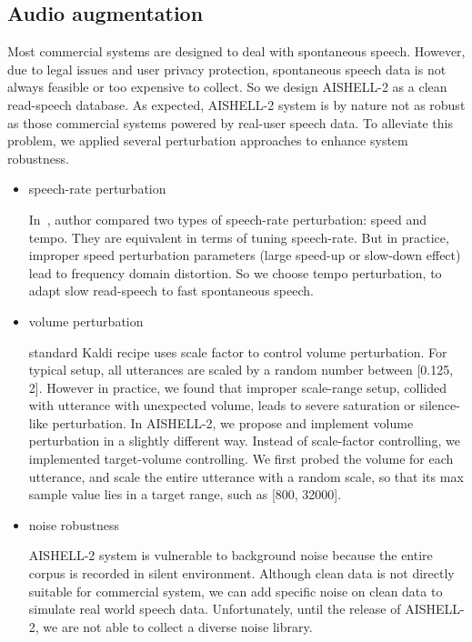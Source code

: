 \documentclass[a4paper]{article}
\begin{document}
\subsection{Audio augmentation}

Most commercial systems are designed to deal with spontaneous speech. However,
due to legal issues and user privacy protection, spontaneous speech data is not
always feasible or too expensive to collect. So we design AISHELL-2 as a clean
read-speech database. As expected, AISHELL-2 system is by nature not as robust
as those commercial systems powered by real-user speech data. To alleviate this
problem, we applied several perturbation approaches to enhance system
robustness.

\begin{itemize}
\item speech-rate perturbation

  In~\cite{tomko}, author compared two types of speech-rate perturbation: speed
  and tempo. They are equivalent in terms of tuning speech-rate. But in
  practice, improper speed perturbation parameters (large speed-up or slow-down
  effect) lead to frequency domain distortion. So we choose tempo perturbation,
  to adapt slow read-speech to fast spontaneous speech.

\item volume perturbation

  standard Kaldi recipe uses scale factor to control volume perturbation. For
  typical setup, all utterances are scaled by a random number between [0.125,
    2]. However in practice, we found that improper scale-range setup, collided
  with utterance with unexpected volume, leads to severe saturation or
  silence-like perturbation. In AISHELL-2, we propose and implement volume
  perturbation in a slightly different way. Instead of scale-factor controlling,
  we implemented target-volume controlling. We first probed the volume for each
  utterance, and scale the entire utterance with a random scale, so that its max
  sample value lies in a target range, such as [800, 32000].

\item noise robustness

  AISHELL-2 system is vulnerable to background noise because the entire corpus
  is recorded in silent environment. Although clean data is not directly
  suitable for commercial system, we can add specific noise on clean data to
  simulate real world speech data. Unfortunately, until the release of
  AISHELL-2, we are not able to collect a diverse noise library.


\end{itemize}
\end{document}

